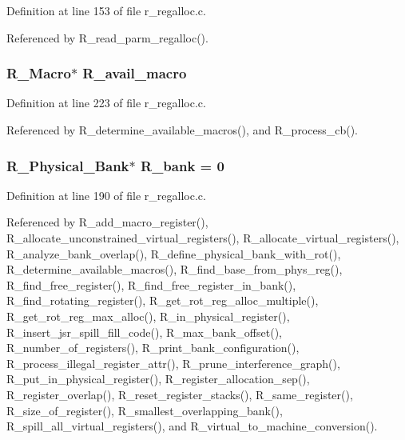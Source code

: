Definition at line 153 of file r\_\-regalloc.c.

Referenced by R\_\-read\_\-parm\_\-regalloc().
\subsubsection{\setlength{\rightskip}{0pt plus 5cm}\bf{R\_\-Macro}$\ast$ \bf{R\_\-avail\_\-macro}}\label{r__regalloc_8c_c02ed243a1595ec434dce74e462980e7}




Definition at line 223 of file r\_\-regalloc.c.

Referenced by R\_\-determine\_\-available\_\-macros(), and R\_\-process\_\-cb().
\subsubsection{\setlength{\rightskip}{0pt plus 5cm}\bf{R\_\-Physical\_\-Bank}$\ast$ \bf{R\_\-bank} = 0}\label{r__regalloc_8c_7c53b9c99d7cdeb5f475a3ea6133b616}




Definition at line 190 of file r\_\-regalloc.c.

Referenced by R\_\-add\_\-macro\_\-register(), R\_\-allocate\_\-unconstrained\_\-virtual\_\-registers(), R\_\-allocate\_\-virtual\_\-registers(), R\_\-analyze\_\-bank\_\-overlap(), R\_\-define\_\-physical\_\-bank\_\-with\_\-rot(), R\_\-determine\_\-available\_\-macros(), R\_\-find\_\-base\_\-from\_\-phys\_\-reg(), R\_\-find\_\-free\_\-register(), R\_\-find\_\-free\_\-register\_\-in\_\-bank(), R\_\-find\_\-rotating\_\-register(), R\_\-get\_\-rot\_\-reg\_\-alloc\_\-multiple(), R\_\-get\_\-rot\_\-reg\_\-max\_\-alloc(), R\_\-in\_\-physical\_\-register(), R\_\-insert\_\-jsr\_\-spill\_\-fill\_\-code(), R\_\-max\_\-bank\_\-offset(), R\_\-number\_\-of\_\-registers(), R\_\-print\_\-bank\_\-configuration(), R\_\-process\_\-illegal\_\-register\_\-attr(), R\_\-prune\_\-interference\_\-graph(), R\_\-put\_\-in\_\-physical\_\-register(), R\_\-register\_\-allocation\_\-sep(), R\_\-register\_\-overlap(), R\_\-reset\_\-register\_\-stacks(), R\_\-same\_\-register(), R\_\-size\_\-of\_\-register(), R\_\-smallest\_\-overlapping\_\-bank(), R\_\-spill\_\-all\_\-virtual\_\-registers(), and R\_\-virtual\_\-to\_\-machine\_\-conversion().
